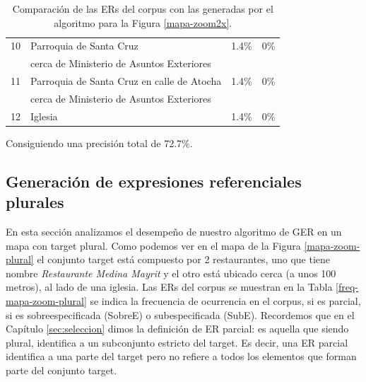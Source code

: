 \begin{table}[h]
{\begin{center}
\begin{tabular}{|l|l|c|c|}
10&Parroquia de Santa Cruz  				               &    1.4\%	&0\% \\  
&cerca de Ministerio de Asuntos Exteriores		           &	  		&\\  \hline
11&Parroquia de Santa Cruz en calle de Atocha  		       &	1.4\%	&0\% \\  
&cerca de Ministerio de Asuntos Exteriores		   	       &	    	&\\  \hline
12&Iglesia						                           &    1.4\%	& 0\% \\  \hline
\end{tabular}
\caption{Comparaci\'on de las ERs del corpus con las generadas por el algoritmo para la Figura \ref{mapa-zoom2x}.}\label{compara-mapa-zoom2x}
\end{center}
}
\end{table}

Consiguiendo una precisi\'on total de 72.7\%.

\subsection{Generaci\'on de expresiones referenciales plurales}
\label{sec:plural}


En esta secci\'on analizamos el desempe\~no de nuestro algoritmo de GER en un mapa con target plural. Como podemos ver en el mapa de la Figura \ref{mapa-zoom-plural} el conjunto target est\'a compuesto por 2 restaurantes, uno que tiene nombre {\it Restaurante Medina Mayrit} y el otro est\'a ubicado cerca (a unos 100 metros), al lado de una iglesia. Las ERs del corpus se muestran en la Tabla \ref{freq-mapa-zoom-plural} se indica la frecuencia de ocurrencia en el corpus, si es parcial, si es sobreespecificada (SobreE) o subespecificada (SubE). 
Recordemos que en el Cap\'itulo \ref{sec:seleccion} dimos la definici\'on de ER parcial: es aquella que siendo plural, identifica a un subconjunto estricto del target. Es decir, una ER parcial identifica a una parte del target pero no refiere a todos los elementos que forman parte del conjunto target.


